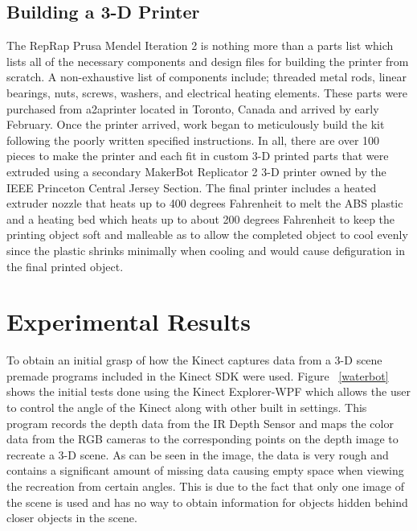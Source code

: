 \documentclass[pdftex,10.5pt]{report}
\begin{document}
\subsection{Building a 3-D Printer}
The RepRap Prusa Mendel Iteration 2 is nothing more than a parts list which lists all of the necessary components and design files for building the printer from scratch. A non-exhaustive list of components include; threaded metal rods, linear bearings, nuts, screws, washers, and electrical heating elements. These parts were purchased from a2aprinter located in Toronto, Canada and arrived by early February. Once the printer arrived, work began to meticulously build the kit following the poorly written specified instructions. In all, there are over 100 pieces to make the printer and each fit in custom 3-D printed parts that were extruded using a secondary MakerBot Replicator 2 3-D printer owned by the IEEE Princeton Central Jersey Section. The final printer includes a heated extruder nozzle that heats up to 400 degrees Fahrenheit to melt the ABS plastic and a heating bed which heats up to about 200 degrees Fahrenheit to keep the printing object soft and malleable as to allow the completed object to cool evenly since the plastic shrinks minimally when cooling and would cause defiguration in the final printed object.

\section{Experimental Results}
To obtain an initial grasp of how the Kinect captures data from a 3-D scene premade programs included in the Kinect SDK were used. Figure ~\ref{waterbot}  shows the initial tests done using the Kinect Explorer-WPF which allows the user to control the angle of the Kinect along with other built in settings. This program records the depth data from the IR Depth Sensor and maps the color data from the RGB cameras to the corresponding points on the depth image to recreate a 3-D scene. As can be seen in the image, the data is very rough and contains a significant amount of missing data causing empty space when viewing the recreation from certain angles. This is due to the fact that only one image of the scene is used and has no way to obtain information for objects hidden behind closer objects in the scene.
\end{document}
